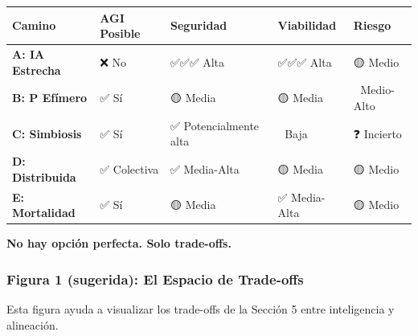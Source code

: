 {\def\LTcaptype{none} %
\begin{longtable}[]{@{}
  >{\raggedright\arraybackslash}p{}
  >{\raggedright\arraybackslash}p{}
  >{\raggedright\arraybackslash}p{}
  >{\raggedright\arraybackslash}p{}
  >{\raggedright\arraybackslash}p{}@{}}
\toprule\noalign{}
\begin{minipage}[b]{\linewidth}\raggedright
\textbf{Camino}
\end{minipage} & \begin{minipage}[b]{\linewidth}\raggedright
\textbf{AGI Posible}
\end{minipage} & \begin{minipage}[b]{\linewidth}\raggedright
\textbf{Seguridad}
\end{minipage} & \begin{minipage}[b]{\linewidth}\raggedright
\textbf{Viabilidad}
\end{minipage} & \begin{minipage}[b]{\linewidth}\raggedright
\textbf{Riesgo}
\end{minipage} \\
\midrule\noalign{}
\endhead
\bottomrule\noalign{}
\endlastfoot
\textbf{A: IA Estrecha} & ❌ No & ✅✅✅ Alta & ✅✅✅ Alta & 🟡
Medio \\
\textbf{B: P Efímero} & ✅ Sí & 🟡 Media & 🟡 Media & 🔴 Medio-Alto \\
\textbf{C: Simbiosis} & ✅ Sí & ✅ Potencialmente alta & 🔴 Baja & ❓
Incierto \\
\textbf{D: Distribuida} & ✅ Colectiva & ✅ Media-Alta & 🟡 Media & 🟡
Medio \\
\textbf{E: Mortalidad} & ✅ Sí & 🟡 Media & ✅ Media-Alta & 🟡 Medio \\
\end{longtable}
}

\textbf{No hay opción perfecta. Solo trade-offs.}

\subsubsection{Figura 1 (sugerida): El Espacio de
Trade-offs}\label{figura-1-sugerida-el-espacio-de-trade-offs}

Esta figura ayuda a visualizar los trade-offs de la Sección 5 entre
inteligencia y alineación.

